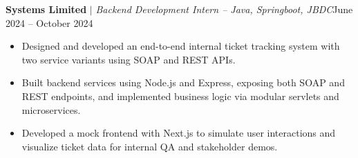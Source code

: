               \resumeProjectHeading
              {\textbf{Systems Limited}\vspace{8pt} $|$ \footnotesize\emph{Backend Development Intern – Java, Springboot, JBDC}}{June 2024 -- October 2024}
              \begin{itemize}
                \item Designed and developed an end-to-end internal ticket tracking system with two service variants using SOAP and REST APIs.
                \item Built backend services using Node.js and Express, exposing both SOAP and REST endpoints, and implemented business logic via modular servlets and microservices.
                \item Developed a mock frontend with Next.js to simulate user interactions and visualize ticket data for internal QA and stakeholder demos.
              \end{itemize}

   

    \resumeSubHeadingListEnd